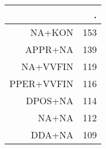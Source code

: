 \begin{tabular}{rr}
  \hline
 & . \\ 
  \hline
NA+KON & 153 \\ 
  APPR+NA & 139 \\ 
  NA+VVFIN & 119 \\ 
  PPER+VVFIN & 116 \\ 
  DPOS+NA & 114 \\ 
  NA+NA & 112 \\ 
  DDA+NA & 109 \\ 
   \hline
\end{tabular}
